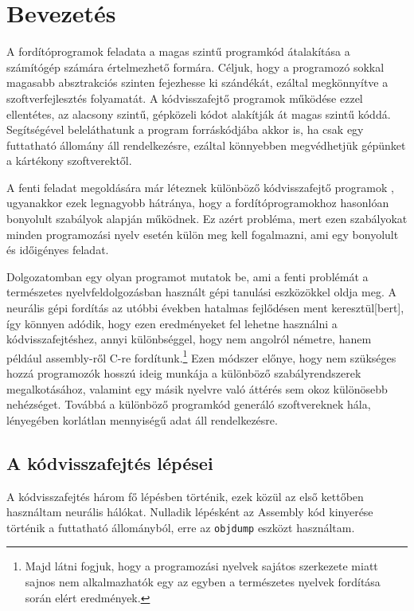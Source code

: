 \chapter{Bevezetés}
\label{ch:intro}

A fordítóprogramok feladata a magas szintű programkód átalakítása a számítógép számára értelmezhető formára. Céljuk, hogy a programozó sokkal magasabb absztrakciós szinten fejezhesse ki szándékát, ezáltal megkönnyítve a szoftverfejlesztés folyamatát. A kódvisszafejtő programok működése ezzel ellentétes, az alacsony szintű, gépközeli kódot alakítják át magas szintű kóddá. Segítségével beleláthatunk a program forráskódjába akkor is, ha csak egy futtatható állomány áll rendelkezésre, ezáltal könnyebben megvédhetjük gépünket a kártékony szoftverektől.

A fenti feladat megoldására már léteznek különböző kódvisszafejtő programok \cite{ghidra, binaryninja}, ugyanakkor ezek legnagyobb hátránya, hogy a fordítóprogramokhoz hasonlóan bonyolult szabályok alapján működnek. Ez azért probléma, mert ezen szabályokat minden programozási nyelv esetén külön meg kell fogalmazni, ami egy bonyolult és időigényes feladat.

Dolgozatomban egy olyan programot mutatok be, ami a fenti problémát a természetes nyelvfeldolgozásban használt gépi tanulási eszközökkel oldja meg. A neurális gépi fordítás az utóbbi években hatalmas fejlődésen ment keresztül[bert], így könnyen adódik, hogy ezen eredményeket fel lehetne használni a kódvisszafejtéshez, annyi különbséggel, hogy nem angolról németre, hanem például assembly-ről C-re fordítunk.\footnote{Majd látni fogjuk, hogy a programozási nyelvek sajátos szerkezete miatt sajnos nem alkalmazhatók egy az egyben a természetes nyelvek fordítása során elért eredmények.} Ezen módszer előnye, hogy nem szükséges hozzá programozók hosszú ideig munkája a különböző szabályrendszerek megalkotásához, valamint egy másik nyelvre való áttérés sem okoz különösebb nehézséget. Továbbá a különböző programkód generáló szoftvereknek\cite{??} hála, lényegében korlátlan mennyiségű adat áll rendelkezésre.

\section{A kódvisszafejtés lépései}
A kódvisszafejtés három fő lépésben történik, ezek közül az első kettőben
használtam neurális hálókat. Nulladik lépésként az Assembly kód kinyerése
történik a futtatható állományból, erre az \texttt{objdump} eszközt használtam.


